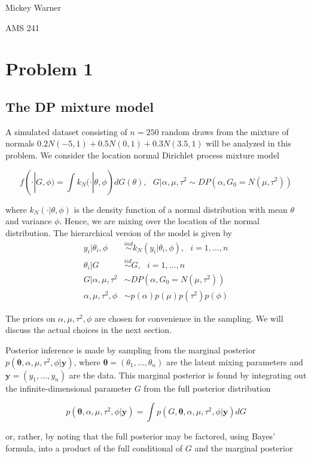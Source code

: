 \documentclass[12pt]{article}
\newcommand{\m}[1]{\mathbf{\bm{#1}}}
\begin{document}
\noindent Mickey Warner

\noindent AMS 241

\section*{Problem 1}

\subsection*{The DP mixture model}

A simulated dataset consisting of $n=250$ random draws from the mixture of normals $0.2N(-5, 1)+0.5N(0,1)+0.3N(3.5,1)$ will be analyzed in this problem. We consider the location normal Dirichlet process mixture model

\[ f(\cdot|G, \phi) = \int k_N(\cdot|\theta, \phi)dG(\theta),~~~G|\alpha,\mu,\tau^2\sim DP(\alpha, G_0=N(\mu,\tau^2)) \]

\noindent where $k_N(\cdot|\theta,\phi)$ is the density function of a normal distribution with mean $\theta$ and variance $\phi$. Hence, we are mixing over the location of the normal distribution. The hierarchical version of the model is given by 
\begin{align*}
y_i|\theta_i,\phi &\overset{ind}\sim k_N(y_i|\theta_i,\phi),~~~i=1,\ldots,n \\
\theta_i|G &\overset{iid}\sim G,~~~i=1,\ldots,n \\
G|\alpha,\mu,\tau^2 &\sim DP(\alpha, G_0=N(\mu,\tau^2)) \\
\alpha,\mu,\tau^2,\phi &\sim p(\alpha)p(\mu)p(\tau^2)p(\phi) 
\end{align*}

\noindent The priors on $\alpha, \mu, \tau^2, \phi$ are chosen for convenience in the sampling. We will discuss the actual choices in the next section.

Posterior inference is made by sampling from the marginal posterior $p(\m{\theta},\alpha,\mu,\tau^2,\phi|\m{y})$, where $\m{\theta}=(\theta_1,\ldots,\theta_n)$ are the latent mixing parameters and $\m{y}=(y_1,\ldots,y_n)$ are the data. This marginal posterior is found by integrating out the infinite-dimensional parameter $G$ from the full posterior distribution

\[p(\m{\theta},\alpha,\mu,\tau^2,\phi|\m{y}) = \int p(G,\m{\theta},\alpha,\mu,\tau^2,\phi|\m{y})dG \]

\noindent or, rather, by noting that the full posterior may be factored, using Bayes' formula, into a product of the full conditional of $G$ and the marginal posterior
\end{document}
